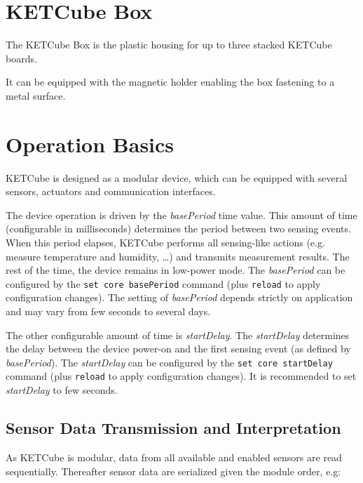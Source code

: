 \section{KETCube Box}

 The KETCube Box is the plastic housing for up to three stacked KETCube boards.
 
 It can be equipped with the magnetic holder enabling the box fastening to a metal surface.

\clearpage
\section{Operation Basics}\label{sec:opBasics}
KETCube is designed as a modular device, which can be equipped with several sensors, actuators and communication interfaces.

The device operation is driven by the {\it basePeriod} time value. This amount of time (configurable in milliseconds) determines the period between two sensing events. When this period elapses, KETCube performs all sensing-like actions (e.g. measure temperature and humidity, \dots) and transmits measurement results. The rest of the time, the device remains in low-power mode. The {\it basePeriod} can be configured by the {\tt set core basePeriod} command  (plus {\tt reload} to apply configuration changes). The setting of {\it basePeriod} depends strictly on application and may vary from few seconds to several days.

The other configurable amount of time is {\it startDelay}. The {\it startDelay} determines the delay between the device power-on and the first sensing event (as defined by  {\it basePeriod}). The {\it startDelay} can be configured by the {\tt set core startDelay} command  (plus {\tt reload} to apply configuration changes). It is recommended to set {\it startDelay} to few seconds.

\subsection{Sensor Data Transmission and Interpretation}

As KETCube is modular, data from all available and enabled sensors are read sequentially. Thereafter sensor data are serialized given the module order, e.g:


